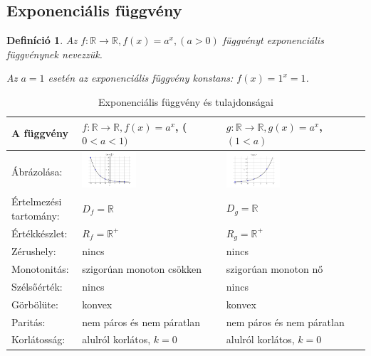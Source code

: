 \documentclass[12pt,a4paper]{article}
\newtheorem{definition}{Definíció} [section]
\begin{document}
\subsection{Exponenciális függvény}
\begin{definition}
Az $f:\mathbb{R}\rightarrow\mathbb{R}, f(x)=a^x, (a>0)$  függvényt exponenciális függvénynek nevezzük.

Az $a=1$ esetén az exponenciális függvény konstans: $f(x)=1^x=1$.
\end{definition}

\begin{table}[h!]
\centering
\begin{tabular}{ | m{3cm} || m{6cm} | m{6cm} | }
A függvény &\centering $f:\mathbb{R}\rightarrow\mathbb{R}, f(x)=a^x$, \newline ($0<a<1)$ & $g:\mathbb{R}\rightarrow\mathbb{R}, g(x)=a^x$, \newline $(1<a)$ \\
\hline
Ábrázolása: &\centering \includegraphics[width=0.4\textwidth]{chart/2021-10-31--11:54:47} & \includegraphics[width=0.4\textwidth]{chart/2021-10-31--11:55:41}\\
\hline
Értelmezési tartomány: & $D_f=\mathbb{R}$ & $D_g=\mathbb{R}$ \\
\hline
Értékkészlet: & $R_f=\mathbb{R}^+$ & $R_g=\mathbb{R}^+$\\
\hline
Zérushely: & nincs & nincs\\
\hline
Monotonitás: &szigorúan monoton csökken&szigorúan monoton nő \\
\hline
Szélsőérték: & nincs & nincs\\
\hline
Görbölüte: & konvex & konvex\\
\hline
Paritás: & nem páros és nem páratlan & nem páros és nem páratlan \\
\hline
Korlátosság: & alulról korlátos, $k=0$ & alulról korlátos, $k=0$ \\
\end{tabular}
\caption{Exponenciális függvény és tulajdonságai}
\label{table:exp_fugg}
\end{table}
\newpage
\end{document}
